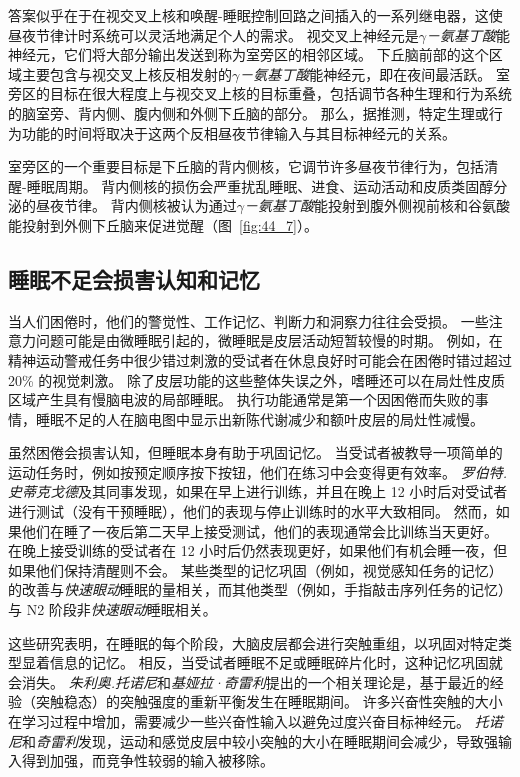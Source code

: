 答案似乎在于在视交叉上核和唤醒-睡眠控制回路之间插入的一系列继电器，这使昼夜节律计时系统可以灵活地满足个人的需求。
视交叉上神经元是\textit{$\gamma$－氨基丁酸}能神经元，它们将大部分输出发送到称为室旁区的相邻区域。
下丘脑前部的这个区域主要包含与视交叉上核反相发射的\textit{$\gamma$－氨基丁酸}能神经元，即在夜间最活跃。
室旁区的目标在很大程度上与视交叉上核的目标重叠，包括调节各种生理和行为系统的脑室旁、背内侧、腹内侧和外侧下丘脑的部分。
那么，据推测，特定生理或行为功能的时间将取决于这两个反相昼夜节律输入与其目标神经元的关系。


室旁区的一个重要目标是下丘脑的背内侧核，它调节许多昼夜节律行为，包括清醒-睡眠周期。
背内侧核的损伤会严重扰乱睡眠、进食、运动活动和皮质类固醇分泌的昼夜节律。
背内侧核被认为通过\textit{$\gamma$－氨基丁酸}能投射到腹外侧视前核和谷氨酸能投射到外侧下丘脑来促进觉醒（图~\ref{fig:44_7}）。



\subsection{睡眠不足会损害认知和记忆}

当人们困倦时，他们的警觉性、工作记忆、判断力和洞察力往往会受损。
一些注意力问题可能是由微睡眠引起的，微睡眠是皮层活动短暂较慢的时期。
例如，在精神运动警戒任务中很少错过刺激的受试者在休息良好时可能会在困倦时错过超过 20\% 的视觉刺激。
除了皮层功能的这些整体失误之外，嗜睡还可以在局灶性皮质区域产生具有慢脑电波的局部睡眠。
执行功能通常是第一个因困倦而失败的事情，睡眠不足的人在脑电图中显示出新陈代谢减少和额叶皮层的局灶性减慢。


虽然困倦会损害认知，但睡眠本身有助于巩固记忆。
当受试者被教导一项简单的运动任务时，例如按预定顺序按下按钮，他们在练习中会变得更有效率。
\textit{罗伯特.史蒂克戈德}及其同事发现，如果在早上进行训练，并且在晚上 12 小时后对受试者进行测试（没有干预睡眠），他们的表现与停止训练时的水平大致相同。
然而，如果他们在睡了一夜后第二天早上接受测试，他们的表现通常会比训练当天更好。
在晚上接受训练的受试者在 12 小时后仍然表现更好，如果他们有机会睡一夜，但如果他们保持清醒则不会。
某些类型的记忆巩固（例如，视觉感知任务的记忆）的改善与\textit{快速眼动}睡眠的量相关，而其他类型（例如，手指敲击序列任务的记忆）与 N2 阶段非\textit{快速眼动}睡眠相关。


这些研究表明，在睡眠的每个阶段，大脑皮层都会进行突触重组，以巩固对特定类型显着信息的记忆。
相反，当受试者睡眠不足或睡眠碎片化时，这种记忆巩固就会消失。
\textit{朱利奥.托诺尼}和\textit{基娅拉·奇雷利}提出的一个相关理论是，基于最近的经验（突触稳态）的突触强度的重新平衡发生在睡眠期间。
许多兴奋性突触的大小在学习过程中增加，需要减少一些兴奋性输入以避免过度兴奋目标神经元。
\textit{托诺尼}和\textit{奇雷利}发现，运动和感觉皮层中较小突触的大小在睡眠期间会减少，导致强输入得到加强，而竞争性较弱的输入被移除。


